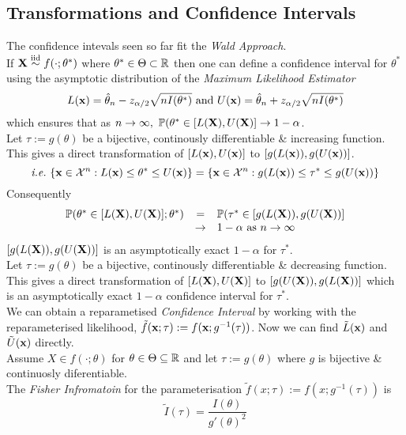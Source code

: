 \documentclass[11pt,a4paper]{article}
\begin{document}
\subsection{Transformations and Confidence Intervals}

The confidence intevals seen so far fit the \textit{Wald Approach}.\\
If $\textbf{X}\overset{\text{iid}}{\sim} f(\cdot;\theta^*)$ where $\theta^*\in\Theta\subset\mathbb{R}$ then one can define a confidence interval for $\theta^*$ using the asymptotic distribution of the \textit{Maximum Likelihood Estimator}
$$L(\textbf{x})=\hat\theta_n-z_{\alpha/2}\sqrt{nI(\theta^*)}\text{ and }U(\textbf{x})=\hat\theta_n+z_{\alpha/2}\sqrt{nI(\theta^*)}$$
which ensures that as $n\to\infty,\ \prob(\theta^*\in[L(\X),U(\X)]\to1-\alpha$.\\

Let $\tau:=g(\theta)$ be a bijective, continously differentiable \& increasing function.\\
This gives a direct transformation of $[L(\textbf{x}),U(\textbf{x})]$ to $[g(L(\textbf{x})),g(U(\textbf{x}))]$.
$$\textit{i.e.}\ \{\textbf{x}\in\mathcal{X}^n:L(\textbf{x})\leq\theta^*\leq U(\textbf{x})\}=\{\textbf{x}\in\mathcal{X}^n:g(L(\textbf{x}))\leq\tau^*\leq g(U(\textbf{x}))\}$$
Consequently
\[\begin{array}{rcl}
\mathbb{P}(\theta^*\in[L(\textbf{X}),U(\textbf{X})];\theta^*)&=&\mathbb{P}(\tau^*\in[g(L(\textbf{X})),g(U(\textbf{X}))]\\
&\to&1-\alpha\text{ as }n\to\infty
\end{array}\]
\ie $[g(L(\textbf{X})),g(U(\textbf{X}))]$ is an asymptotically exact $1-\alpha$ for $\tau^*$.\\

Let $\tau:=g(\theta)$ be a bijective, continously differentiable \& decreasing function.\\
This gives a direct transformation of $[L(\textbf{X}),U(\textbf{X})]$ to $[g(U(\textbf{X})),g(L(\textbf{X}))]$ which is an asymptotically exact $1-\alpha$ confidence interval for $\tau^*$.\\

We can obtain a reparametised \textit{Confidence Interval} by working with the reparameterised likelihood, $\tilde{f}(\textbf{x};\tau):=f(\textbf{x};g^{-1}(\tau))$. Now we can find $\tilde{L}(\textbf{x})$ and $\tilde{U}(\textbf{x})$ directly.\\

\theorem{}
Assume $X\in f(\cdot;\theta)$ for $\theta\in\Theta\subseteq\mathbb{R}$ and let $\tau:=g(\theta)$ where $g$ is bijective \& continuosly diferentiable.\\
The \textit{Fisher Infromatoin} for the parameterisation $\tilde{f}(x;\tau):=f(x;g^{-1}(\tau))$ is
$$\tilde{I}(\tau)=\frac{I(\theta)}{g'(\theta)^2}$$
\end{document}
